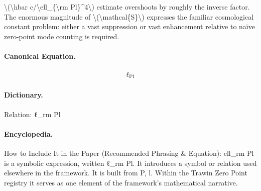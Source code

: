 \textbackslash{}(\textbackslash{}hbar c/\textbackslash{}ell\_\{\textbackslash{}rm Pl\}\textasciicircum{}4\textbackslash{}) estimate overshoots by roughly the inverse factor. The enormous magnitude of \textbackslash{}(\textbackslash{}mathcal\{S\}\textbackslash{}) expresses the familiar cosmological constant problem: either a vast suppression or vast enhancement relative to naïve zero-point mode counting is required.

\paragraph{Canonical Equation.}
\[
\ell_{\rm Pl}
\]

\paragraph{Dictionary.}
Relation: ℓ\_rm Pl

\paragraph{Encyclopedia.}
How to Include It in the Paper (Recommended Phrasing \& Equation): ell\_rm Pl is a symbolic expression, written ℓ\_rm Pl. It introduces a symbol or relation used elsewhere in the framework. It is built from P, l. Within the Trawin Zero Point registry it serves as one element of the framework's mathematical narrative.
